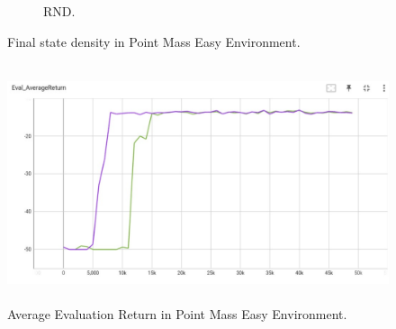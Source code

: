 \documentclass{article}
\begin{document}
\begin{answer}[title=Plot,height=9.5cm,width=\linewidth]
\begin{figure}[H]
\begin{subfigure}[b]{.45\linewidth}
            \caption{RND.}
        \end{subfigure}
        \caption{Final state density in Point Mass Easy Environment.}
    \end{figure}
\end{answer}

\begin{answer}[title=Plot,height=9.5cm,width=\linewidth]
    \begin{figure}[H]
        \centering
        \includegraphics[height=7cm]{figs/P6_easy_return.pdf}
        \caption{Average Evaluation Return in Point Mass Easy Environment.
            \color{violet}{Purple: RND.}
            \color{green}{Green: Random.}}
    \end{figure}
\end{answer}
\end{document}
